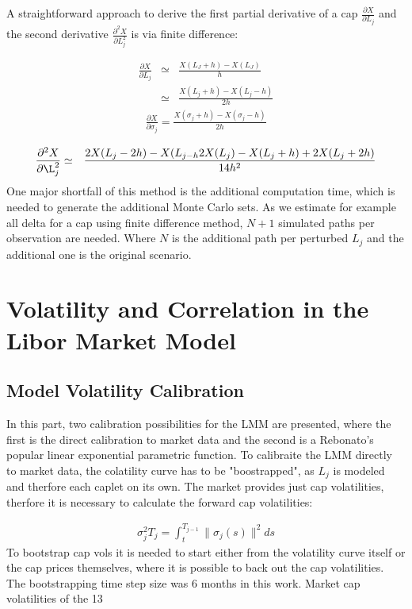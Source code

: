 \documentclass[11pt]{article}
\numberwithin{equation}{subsection}
\begin{document}
A straightforward approach to derive the first partial derivative of a cap \(\frac{\partial X}{\partial L_j}\) and the second derivative \(\frac{\partial^2 X}{\partial L_j^2}\) is via finite difference:


\begin{eqnarray*}
	\frac{\partial X}{\partial L_j} &\simeq& \frac{X(L_J + h) - X(L_J)}{h} \\
	&\simeq& \frac{X(L_{j} + h) - X(L_{j} - h)}{2h}
\end{eqnarray*}	
\begin{eqnarray*}
	\frac{\partial X}{\partial \sigma_{j}} = \frac{X(\sigma_{j} + h) - X(\sigma_{j} - h)}{2h}
\end{eqnarray*}

\begin{eqnarray*}
	\frac{\partial^2 X}{\partial \L_{j}^2}  &\simeq&  \frac{2X(L_{j} -2h) - X(L_{j-h} 2X (L_{j}) -X(L_{j} + h) + 2X(L_j + 2h)}{14h^2}
\end{eqnarray*}
One major shortfall of this method is the additional computation time, which is needed to generate the additional Monte Carlo sets. As we estimate for example all delta for a cap using finite difference method, \(N+1\) simulated paths per observation are needed. Where \(N\) is the additional path per perturbed \(L_j\) and the additional one is the original scenario.


\section{Volatility and Correlation in the Libor Market Model}
\subsection{Model Volatility Calibration}
In this part, two calibration possibilities for the LMM are presented, where the first is the direct calibration to market data and the second is a Rebonato's popular linear exponential parametric function. To calibraite the LMM directly to market data, the colatility curve has to be "boostrapped", as \(L_j\) is modeled and therfore each caplet on its own. The market provides just cap volatilities, therfore it is necessary to calculate the forward cap volatilities:

\begin{eqnarray*}
	\sigma_j^2T_{j} = \int_{t}^{T_{j-1}} \|\sigma_{j}(s)\|^2 ds
\end{eqnarray*}
To bootstrap cap vols it is needed to start either from the volatility curve itself or the cap prices themselves, where it is possible to back out the cap volatilities. The bootstrapping time step size was 6 months in this work. Market cap volatilities of the 13
	
\end{document}
